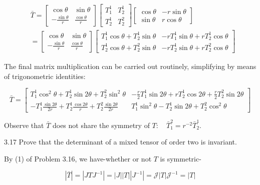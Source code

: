 \documentclass[10pt]{article}
\begin{document}
$$
\begin{aligned}
& \bar{T}=\left[\begin{array}{cc}
\cos \theta & \sin \theta \\
-\frac{\sin \theta}{r} & \frac{\cos \theta}{r}
\end{array}\right]\left[\begin{array}{cc}
T_{1}^{1} & T_{2}^{1} \\
T_{2}^{1} & T_{2}^{2}
\end{array}\right]\left[\begin{array}{cc}
\cos \theta & -r \sin \theta \\
\sin \theta & r \cos \theta
\end{array}\right] \\
& =\left[\begin{array}{cc}
\cos \theta & \sin \theta \\
-\frac{\sin \theta}{r} & \frac{\cos \theta}{r}
\end{array}\right]\left[\begin{array}{cc}
T_{1}^{1} \cos \theta+T_{2}^{1} \sin \theta & -r T_{1}^{1} \sin \theta+r T_{2}^{1} \cos \theta \\
T_{2}^{1} \cos \theta+T_{2}^{2} \sin \theta & -r T_{2}^{1} \sin \theta+r T_{2}^{2} \cos \theta
\end{array}\right]
\end{aligned}
$$

The final matrix multiplication can be carried out routinely, simplifying by means of trigonometric identities:

$$
\bar{T}=\left[\begin{array}{cc}
T_{1}^{1} \cos ^{2} \theta+T_{2}^{1} \sin 2 \theta+T_{2}^{2} \sin ^{2} \theta & -\frac{r}{2} T_{1}^{1} \sin 2 \theta+r T_{2}^{1} \cos 2 \theta+\frac{r}{2} T_{2}^{2} \sin 2 \theta \\
-T_{1}^{1} \frac{\sin 2 \theta}{2 r}+T_{2}^{1} \frac{\cos 2 \theta}{r}+T_{2}^{2} \frac{\sin 2 \theta}{2 r} & T_{1}^{1} \sin ^{2} \theta-T_{2}^{1} \sin 2 \theta+T_{2}^{2} \cos ^{2} \theta
\end{array}\right]
$$

Observe that $\bar{T}$ does not share the symmetry of $T: \quad \bar{T}_{1}^{2}=r^{-2} \bar{T}_{2}^{1}$.

3.17 Prove that the determinant of a mixed tensor of order two is invariant.

By (1) of Problem 3.16, we have-whether or not $T$ is symmetric-

$$
|\bar{T}|=\left|J T J^{-1}\right|=|J||T|\left|J^{-1}\right|=\mathscr{J}|T| \mathscr{J}^{-1}=|T|
$$
\end{document}
